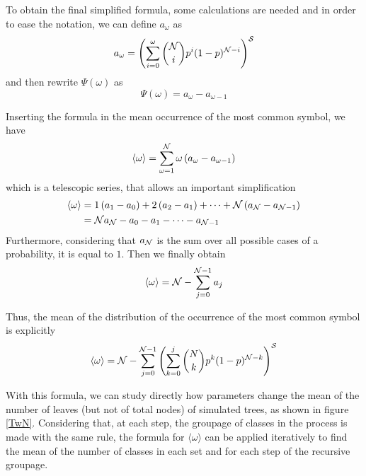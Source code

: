 To obtain the final simplified formula, some calculations are needed and in order to ease the notation, we can define $a_{\omega}$ as
\[a_{\omega} = \left( \sum_{i=0}^{ \omega} \binom{\mathcal N}{i} p^i (1-p)^{\mathcal N -i} \right) ^{\mathcal S} \]
and then rewrite $\Psi (\omega)$ as
\[\Psi (\omega) = a_{ \omega} - a_{ \omega-1} \]

Inserting the formula in the mean occurrence of the most common symbol, we have
\[\langle \omega \rangle = \sum_{\omega = 1}^{\mathcal N} \omega \left(a_{ \omega} - a_{ \omega-1}\right) \]
which is a telescopic series, that allows an important simplification 
\begin{align*}
\langle \omega \rangle &= 1\left(a_{1} - a_{0}\right) + 2\left(a_{2} - a_{1}\right)+ \dots + \mathcal N\left(a_{\mathcal N} - a_{\mathcal N-1}\right) \\
&= \mathcal N a_{\mathcal N} - a_{0} - a_{1} - \dots - a_{\mathcal N-1}
\end{align*}
Furthermore, considering that $a_{\mathcal N}$ is the sum over all possible cases of a probability, it is equal to $1$. Then we finally obtain
\[ \langle \omega \rangle = \mathcal N - \sum_{j=0}^{\mathcal N -1} a_j \]

Thus, the mean of the distribution of the occurrence of the most common symbol is explicitly
\[ \langle \omega \rangle =  \mathcal N - \sum_{j=0}^{\mathcal N -1} \left( \sum_{k=0}^{j} \binom{N}{k} p^k (1-p)^{\mathcal N -k} \right)^\mathcal S \]

With this formula, we can study directly how parameters change the mean of the number of leaves (but not of total nodes) of simulated trees, as shown in figure \ref{TwN}. Considering that, at each step, the groupage of classes in the process is made with the same rule, the formula for $\langle \omega \rangle$ can be applied iteratively to find the mean of the number of classes in each set and for each step of the recursive groupage.

